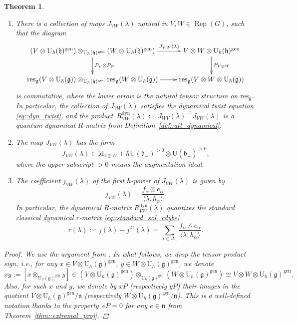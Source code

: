\documentclass[10pt,a4paper]{article}
\numberwithin{equation}{section}
\newtheorem{Theorem}{Theorem}[section]
\newcommand{\U}{\mathrm{U}_{\hbar}}
\renewcommand{\b}{\mathfrak{b}}
\newcommand{\g}{\mathfrak{g}}
\newcommand{\h}{\mathfrak{h}}
\newcommand{\n}{\mathfrak{n}}
\newcommand{\dyn}{\mathrm{dyn}}
\newcommand{\gen}{\mathrm{gen}}
\newcommand{\id}{\mathrm{id}}
\DeclareMathOperator{\Rep}{Rep}
\newcommand{\res}{\mathrm{res}}
\begin{document}
	\begin{Theorem}
		\label{thm::dynamical_quantization}\qquad
		\begin{enumerate}\itemsep=0pt
			\item[$(1)$] There is a collection of maps $J_{VW}(\lambda)$ natural in $V,W\in \Rep(G)$, such that the diagram
			\[
			\xymatrix{
				(V \otimes \U(\h)^{\gen}) \otimes_{\U(\h)^{\gen}} (W \otimes \U(\h)^{\gen}) \ar[r]^-{J_{VW}(\lambda)} \ar[d]^{P_V \otimes P_W} & V \otimes W \otimes \U(\h)^{\gen} \ar[d]^{P_{V\otimes W}} \\
				\res_{\g}(V \otimes \U(\g)) \otimes_{\U(\h)^{\gen}} \res_{\g}(W \otimes \U(\g)) \ar[r] & \res_{\g}(V \otimes W \otimes \U(\g)) \\
			}
			\]
			is commutative, where the lower arrow is the natural tensor structure on $\res_{\g}$. In particular, the collection of $J_{VW}(\lambda)$ satisfies the dynamical twist equation \eqref{eq::dyn_twist}, and the product~${R^{\dyn}_{VW}(\lambda) := J_{WV}(\lambda)^{-1} J_{VW}(\lambda)}$ is a quantum dynamical $R$-matrix from Definition~{\rm\ref{def::all_dynamical}}.
			
			\item[$(2)$] The map $J_{VW}(\lambda)$ has the form
			\[
			J_{VW}(\lambda) \in \id_{V \otimes W} + \hbar \mathrm{U}(\b_-)^{>0} \otimes \mathrm{U}(\b_+)^{>0},
			\]
			where the upper subscript $>0$ means the augmentation ideal.
			
			\item[$(3)$] The coefficient $j_{VW}(\lambda)$ of the first $\hbar$-power of $J_{VW}(\lambda)$ is given by
			\[
			j_{VW}(\lambda) = \frac{f_{\alpha} \otimes e_{\alpha}}{\langle \lambda,h_{\alpha}\rangle }.
			\]
			In particular, the dynamical $R$-matrix $R^{\dyn}_{VW}(\lambda)$ quantizes the standard classical dynamical $r$-matrix \eqref{eq::standard_sol_cdybe}
			\[
			r(\lambda) := j(\lambda) - j^{21}(\lambda) = \sum_{\alpha\in \Delta_+} \frac{f_{\alpha}\wedge e_{\alpha}}{\langle \lambda,h_{\alpha}\rangle }.
			\]
		\end{enumerate}
		\begin{proof}
			We use the argument from \cite{Khoroshkin}. In what follows, we drop the tensor product sign, i.e., for any $x\in V \otimes \U(\g)^{\gen}$, $y\in W \otimes \U(\g)^{\gen}$, we denote
			\[
			xy := [x\otimes_{\U(\g)^{\gen}} y ] \in (V \otimes \U(\g)^{\gen}) \otimes_{\U(\g)^{\gen}} (W \otimes \U(\g)^{\gen}) \cong V \otimes W \otimes \U(\g)^{\gen}.
			\]
			Also, for such $x$ and $y$, we denote by $xP$ (respectively $yP$) their images in the quotient $V \otimes \U(\g)^{\gen} /\n$ (respectively $W \otimes \U(\g)^{\gen} /\n$). This is a well-defined notation thanks to the property~${eP = 0}$ for any $e\in \n$ from Theorem~\ref{thm::extremal_proj}.
			

\end{proof}
\end{Theorem}
\end{document}
